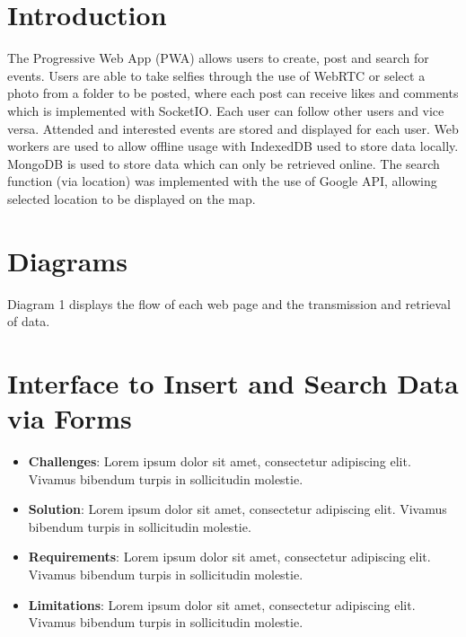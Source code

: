 \documentclass[11pt, a4paper]{article}
\begin{document}
\newpage
\tableofcontents

\newpage
\section{Introduction}
The Progressive Web App (PWA) allows users to create, post and search for events. Users are able to
take selfies through the use of WebRTC or select a photo from a folder to be posted, where each post
can receive likes and comments which is implemented with SocketIO. Each user can follow other users
and vice versa. Attended and interested events are stored and displayed for each user. Web workers
are used to allow offline usage with IndexedDB used to store data locally. MongoDB is used to store
data which can only be retrieved online. The search function (via location) was implemented with the
use of Google API, allowing selected location to be displayed on the map.

\section{Diagrams}
Diagram 1 displays the flow of each web page and the transmission and retrieval of data.

\section{Interface to Insert and Search Data via Forms}
\begin{itemize}
  \item \textbf{Challenges}: Lorem ipsum dolor sit amet, consectetur adipiscing elit. Vivamus
  bibendum turpis in sollicitudin molestie.
  \item \textbf{Solution}: Lorem ipsum dolor sit amet, consectetur adipiscing elit. Vivamus bibendum
  turpis in sollicitudin molestie.
  \item \textbf{Requirements}: Lorem ipsum dolor sit amet, consectetur adipiscing elit. Vivamus
  bibendum turpis in sollicitudin molestie.
  \item \textbf{Limitations}: Lorem ipsum dolor sit amet, consectetur adipiscing elit. Vivamus
  bibendum turpis in sollicitudin molestie.
\end{itemize}
\end{document}
